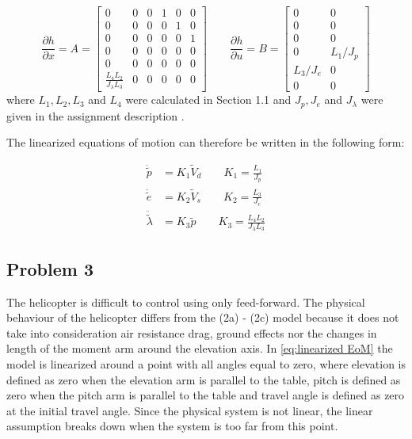 \begin{equation}
\label{eq:Linearized Jacobians}
  \frac{\partial h}{\partial x} = A =
  \begin{bmatrix}
    0 & 0 & 0 & 1 & 0 & 0 \\
    0 & 0 & 0 & 0 & 1 & 0 \\
    0 & 0 & 0 & 0 & 0 & 1 \\
    0 & 0 & 0 & 0 & 0 & 0 \\
    0 & 0 & 0 & 0 & 0 & 0 \\
    \frac{L_4L_2}{J_\lambda L_3} & 0 & 0 & 0 & 0 & 0
  \end{bmatrix}
  \qquad
  \frac{\partial h}{\partial u} = B =
  \begin{bmatrix}
    0 & 0 \\
    0 & 0 \\
    0 & 0 \\
    0 & L_1/J_p \\
    L_3/J_e & 0 \\
    0 & 0
  \end{bmatrix}
\end{equation}
where $L_1, L_2, L_3$ and $L_4$ were calculated in Section 1.1 and
$J_p, J_e$ and $J_\lambda$ were given in the assignment description
\cite[p.14]{assignment}.


The linearized equations of motion can therefore be written in the
following form:

\begin{subequations}
\label{eq:linearized EoM}
  \begin{align}
    \ddot{\tilde{p}} &= K_1\tilde{V}_d \qquad K_1 = \frac{L_1}{J_p} \label{eq:linearized pitch EoM}\\
    \ddot{\tilde{e}} &= K_2\tilde{V}_s \qquad K_2 = \frac{L_3}{J_e} \label{eq:linearized elevation EoM}\\
    \ddot{\tilde{\lambda}} &= K_3\tilde{p} \qquad K_3 = \frac{L_4L_2}{J_\lambda L_3} \label{eq:linearized travel EoM}
  \end{align}
\end{subequations}
\subsection{Problem 3}
The helicopter is difficult to control using only feed-forward. The
physical behaviour of the helicopter differs from the (2a) - (2c)
\cite[p.13]{assignment} model because it does not take into
consideration air resistance drag, ground effects nor the changes in
length of the moment arm around the elevation axis. In
\cref{eq:linearized EoM} the model is linearized around a point with
all
angles equal to zero, where elevation is defined as zero when the
elevation arm is parallel to the table, pitch is defined as zero when
the pitch arm is parallel to the table and travel angle is defined as
zero at the initial travel angle. Since the physical system is not
linear, the linear assumption breaks down when the system is too far
from this point.

